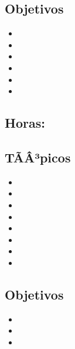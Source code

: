 \subsection*{Objetivos}
\begin{itemize}
	\item \NCTRESObjUNO
	\item \NCTRESObjDOS
	\item \NCTRESObjTRES
	\item \NCTRESObjCUATRO
	\item \NCTRESObjCINCO
	\item \NCTRESObjSEIS
\end{itemize}

\subsection{\NCCUATRODef}\label{sec:BOK-NC4}
\subsection*{Horas: \NCCUATROHours}

\subsection*{TÃÂ³picos}
\begin{itemize}
	\item \NCCUATROTopicTecnologias
	\item \NCCUATROTopicCaracteristicas
	\item \NCCUATROTopicRol
	\item \NCCUATROTopicNaturaleza
	\item \NCCUATROTopicProtocolos
	\item \NCCUATROTopicHerramientas
	\item \NCCUATROTopicDesarrollo
	\item \NCCUATROTopicPublicacion
\end{itemize}

\subsection*{Objetivos}
\begin{itemize}
	\item \NCCUATROObjUNO
	\item \NCCUATROObjDOS
	\item \NCCUATROObjTRES
\end{itemize}

\subsection{\NCCINCODef}\label{sec:BOK-NC5}

